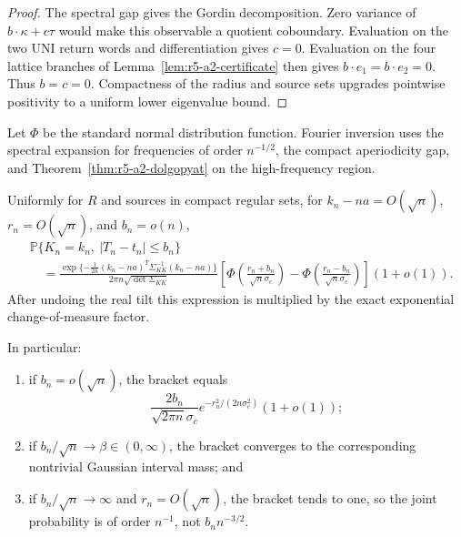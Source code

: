 \begin{proof}
The spectral gap gives the Gordin decomposition.  Zero variance of
\(b\cdot\kappa+c\tau\) would make this observable a quotient coboundary.
Evaluation on the two UNI return words and differentiation gives \(c=0\).
Evaluation on the four lattice branches of
Lemma~\ref{lem:r5-a2-certificate} then gives \(b\cdot e_1=b\cdot e_2=0\).
Thus \(b=c=0\).  Compactness of the radius and source sets upgrades pointwise
positivity to a uniform lower eigenvalue bound.
\end{proof}

Let \(\Phi\) be the standard normal distribution function.  Fourier inversion
uses the spectral expansion for frequencies of order \(n^{-1/2}\), the compact
aperiodicity gap, and Theorem~\ref{thm:r5-a2-dolgopyat} on the high-frequency
region.

\begin{theorem}
\label{thm:r5-a2-llt}
Uniformly for \(R\) and sources in compact regular sets, for
\(k_n-na=O(\sqrt n)\), \(r_n=O(\sqrt n)\), and \(b_n=o(n)\),
\[
 \begin{aligned}
 &\mathbb P\{K_n=k_n,\ |T_n-t_n|\le b_n\}\\
 &\quad=
 \frac{\exp\{-\frac1{2n}(k_n-na)^T
       \Sigma_{KK}^{-1}(k_n-na)\}}
      {2\pi n\sqrt{\det\Sigma_{KK}}}
 \left[
  \Phi\!\left(\frac{r_n+b_n}{\sqrt{n}\sigma_c}\right)
 -\Phi\!\left(\frac{r_n-b_n}{\sqrt{n}\sigma_c}\right)
 \right](1+o(1)).
 \end{aligned}
\]
After undoing the real tilt this expression is multiplied by the exact
exponential change-of-measure factor.

In particular:
\begin{enumerate}[label=(\roman*)]
\item if \(b_n=o(\sqrt n)\), the bracket equals
\[
 \frac{2b_n}{\sqrt{2\pi n}\sigma_c}
 e^{-r_n^2/(2n\sigma_c^2)}(1+o(1));
\]
\item if \(b_n/\sqrt n\to\beta\in(0,\infty)\), the bracket converges to the
      corresponding nontrivial Gaussian interval mass; and
\item if \(b_n/\sqrt n\to\infty\) and \(r_n=O(\sqrt n)\), the bracket tends
      to one, so the joint probability is of order \(n^{-1}\), not
      \(b_nn^{-3/2}\).
\end{enumerate}
\end{theorem}

